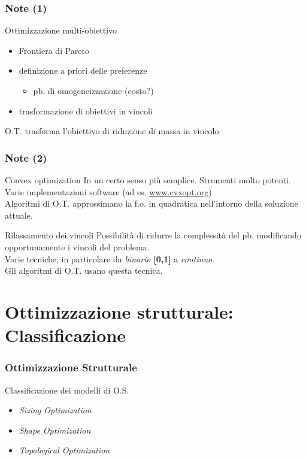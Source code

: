 \documentclass{beamer}
\begin{document}

\begin{frame}
	\frametitle{Note (1)}
	\begin{block}{Ottimizzazione multi-obiettivo}
		\begin{itemize}
			\item Frontiera di Pareto
			\item definizione a priori delle preferenze
			\begin{itemize}
				\item pb. di omogeneizzazione (costo?)
			\end{itemize}
			\item trasformazione di obiettivi in vincoli
		\end{itemize}
		O.T. trasforma l'obiettivo di riduzione di massa in vincolo
	\end{block}
\end{frame}

\begin{frame}
	\frametitle{Note (2)}
	
	\begin{block}{Convex optimization}
		In un certo senso pi\`{u} semplice. Strumenti molto potenti. Varie implementazioni software (ad es. \url{www.cvxopt.org})\\
		Algoritmi di O.T. approssimano la f.o. in quadratica nell'intorno della soluzione attuale. 
	\end{block}

	\begin{block}{Rilassamento dei vincoli}
		Possibilit\`{a} di ridurre la complessit\`{a} del pb. modificando opportunamente i vincoli del problema.\\
		Varie tecniche, in particolare da \textit{binario} \textbf{[0,1]} a \textit{continuo}.\\
		Gli algoritmi di O.T. usano questa tecnica.
	\end{block}
\end{frame}


\section{Ottimizzazione strutturale: Classificazione}


\begin{frame}
	\frametitle{Ottimizzazione Strutturale}
	Classificazione dei modelli di O.S.\cite{christensen2008introduction}
	\begin{itemize}
		\item \textit{Sizing Optimization}
		\item \textit{Shape Optimization}
		\item \textit{Topological Optimization}
	\end{itemize}
\end{frame}
\end{document}
